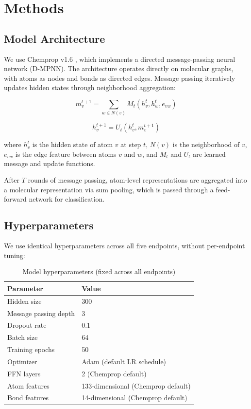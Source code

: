 \documentclass[11pt]{article}
\begin{document}
\section{Methods}

\subsection{Model Architecture}

We use Chemprop v1.6 \citep{yang2019analyzing}, which implements a directed message-passing neural network (D-MPNN). The architecture operates directly on molecular graphs, with atoms as nodes and bonds as directed edges. Message passing iteratively updates hidden states through neighborhood aggregation:

\begin{equation}
m_v^{t+1} = \sum_{w \in N(v)} M_t(h_v^t, h_w^t, e_{vw})
\end{equation}

\begin{equation}
h_v^{t+1} = U_t(h_v^t, m_v^{t+1})
\end{equation}

where $h_v^t$ is the hidden state of atom $v$ at step $t$, $N(v)$ is the neighborhood of $v$, $e_{vw}$ is the edge feature between atoms $v$ and $w$, and $M_t$ and $U_t$ are learned message and update functions.

After $T$ rounds of message passing, atom-level representations are aggregated into a molecular representation via sum pooling, which is passed through a feed-forward network for classification.

\subsection{Hyperparameters}

We use identical hyperparameters across all five endpoints, without per-endpoint tuning:

\begin{table}[h]
\centering
\caption{Model hyperparameters (fixed across all endpoints)}
\label{tab:hyperparams}
\begin{tabular}{ll}
\toprule
Parameter & Value \\
\midrule
Hidden size & 300 \\
Message passing depth & 3 \\
Dropout rate & 0.1 \\
Batch size & 64 \\
Training epochs & 50 \\
Optimizer & Adam (default LR schedule) \\
FFN layers & 2 (Chemprop default) \\
Atom features & 133-dimensional (Chemprop default) \\
Bond features & 14-dimensional (Chemprop default) \\
\bottomrule
\end{tabular}
\end{table}
\end{document}
